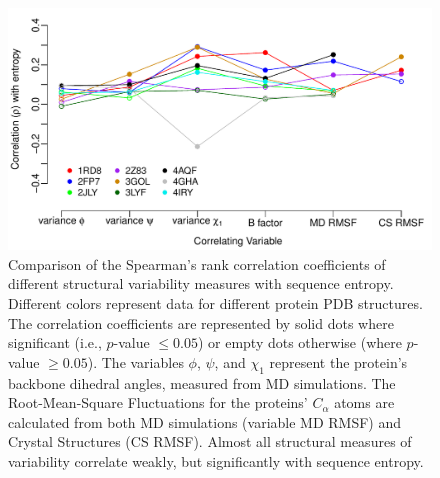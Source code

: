 \documentclass[12pt]{article}
\begin{document}
\begin{figure}[tbh]
\begin{center}
      \includegraphics[height=0.35\textheight]{cor_entropy_SF.pdf}
\end{center}
\caption{Comparison of the Spearman's rank correlation coefficients of different structural variability measures with sequence entropy. Different colors represent data for different protein PDB structures. The correlation coefficients are represented by solid dots where significant (i.e., $p$-value $\leq0.05$) or empty dots otherwise (where $p$-value $\geq0.05$). The variables $\phi$, $\psi$, and $\chi_1$ represent the protein's backbone dihedral angles, measured from MD simulations. The Root-Mean-Square Fluctuations for the proteins' $C_\alpha$ atoms are calculated from both MD simulations (variable MD RMSF) and Crystal Structures (CS RMSF). Almost all structural measures of variability correlate weakly, but significantly with sequence entropy.}
\label{fig:cor_entropy_SF}
\end{figure}
\end{document}

